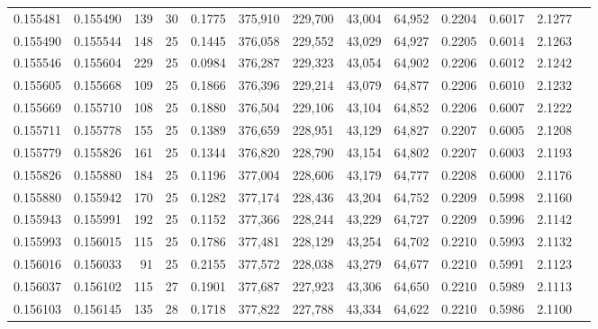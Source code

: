 \begin{tabular}{rrrrrrrrrrrrr}
0.155481 & 0.155490 & 139 &  30 &                                     0.1775 & 375,910 & 229,700 &  43,004 &  64,952 & 0.2204 & 0.6017 & 2.1277 \\
0.155490 & 0.155544 & 148 &  25 &                                     0.1445 & 376,058 & 229,552 &  43,029 &  64,927 & 0.2205 & 0.6014 & 2.1263 \\
0.155546 & 0.155604 & 229 &  25 &                                     0.0984 & 376,287 & 229,323 &  43,054 &  64,902 & 0.2206 & 0.6012 & 2.1242 \\
0.155605 & 0.155668 & 109 &  25 &                                     0.1866 & 376,396 & 229,214 &  43,079 &  64,877 & 0.2206 & 0.6010 & 2.1232 \\
0.155669 & 0.155710 & 108 &  25 &                                     0.1880 & 376,504 & 229,106 &  43,104 &  64,852 & 0.2206 & 0.6007 & 2.1222 \\
0.155711 & 0.155778 & 155 &  25 &                                     0.1389 & 376,659 & 228,951 &  43,129 &  64,827 & 0.2207 & 0.6005 & 2.1208 \\
0.155779 & 0.155826 & 161 &  25 &                                     0.1344 & 376,820 & 228,790 &  43,154 &  64,802 & 0.2207 & 0.6003 & 2.1193 \\
0.155826 & 0.155880 & 184 &  25 &                                     0.1196 & 377,004 & 228,606 &  43,179 &  64,777 & 0.2208 & 0.6000 & 2.1176 \\
0.155880 & 0.155942 & 170 &  25 &                                     0.1282 & 377,174 & 228,436 &  43,204 &  64,752 & 0.2209 & 0.5998 & 2.1160 \\
0.155943 & 0.155991 & 192 &  25 &                                     0.1152 & 377,366 & 228,244 &  43,229 &  64,727 & 0.2209 & 0.5996 & 2.1142 \\
0.155993 & 0.156015 & 115 &  25 &                                     0.1786 & 377,481 & 228,129 &  43,254 &  64,702 & 0.2210 & 0.5993 & 2.1132 \\
0.156016 & 0.156033 &  91 &  25 &                                     0.2155 & 377,572 & 228,038 &  43,279 &  64,677 & 0.2210 & 0.5991 & 2.1123 \\
0.156037 & 0.156102 & 115 &  27 &                                     0.1901 & 377,687 & 227,923 &  43,306 &  64,650 & 0.2210 & 0.5989 & 2.1113 \\
0.156103 & 0.156145 & 135 &  28 &                                     0.1718 & 377,822 & 227,788 &  43,334 &  64,622 & 0.2210 & 0.5986 & 2.1100 \\

\end{tabular}

